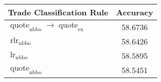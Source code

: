 \begin{tabular}{p{6cm}S}
    {Trade Classification Rule}                                                                                                                                                                                                      & {Accuracy} \\ \toprule
    $\operatorname{quote}_{\text{nbbo}} \to \operatorname{quote}_{\text{ex}}$                                                                                                                                                        & 58.6736    \\
    $\operatorname{rlr}_{\text{nbbo}}$                                                                                                                                                                                               & 58.6426    \\
    $\operatorname{lr}_{\text{nbbo}}$                                                                                                                                                                                                & 58.5895    \\
    $\operatorname{quote}_{\text{nbbo}}$                                                                                                                                                                                             & 58.5451    \\

\end{tabular}
